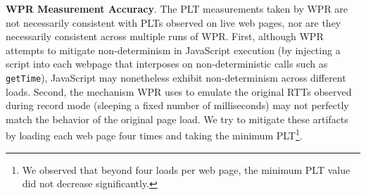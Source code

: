 \textbf{WPR Measurement Accuracy}. The PLT measurements taken by WPR are not necessarily consistent with PLTs observed on live web pages, nor are they necessarily consistent across multiple runs of WPR. First, although WPR attempts to mitigate non-determinism in JavaScript execution (by injecting a script into each webpage that interposes on non-deterministic calls such as \texttt{getTime}), JavaScript may nonetheless exhibit non-determinism across different loads. Second, the mechanism WPR uses to emulate the original RTTs observed during record mode  (sleeping a fixed number of milliseconds) may not perfectly match the behavior of the original page load.
\begingroup
\setcounter{savefootnote}{\value{footnote}}%
\setcounter{footnote}{2}%
\renewcommand{\thefootnote}{1}%
We try to mitigate these artifacts by loading each web page four times and
taking the minimum PLT\footnote{We observed that beyond four loads per web page, the minimum PLT value did not decrease significantly.}.
\setcounter{footnote}{\value{savefootnote}}%
\endgroup

